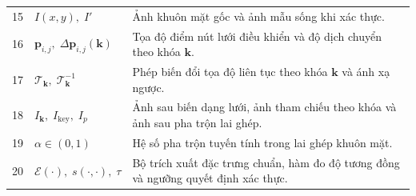 {\begin{longtable}{r l >{\raggedright\arraybackslash}p{8.8cm}}
15 & $I(x, y),\; I'$ & Ảnh khuôn mặt gốc và ảnh mẫu sống khi xác thực. \\
16 & $\mathbf{p}_{i,j},\; \Delta \mathbf{p}_{i,j}(\mathbf{k})$ & Tọa độ điểm nút lưới điều khiển và độ dịch chuyển theo khóa $\mathbf{k}$. \\
17 & $\mathcal{T}_{\mathbf{k}},\; \mathcal{T}_{\mathbf{k}}^{-1}$ & Phép biến đổi tọa độ liên tục theo khóa $\mathbf{k}$ và ánh xạ ngược. \\
18 & $I_{\mathbf{k}},\; I_{\text{key}},\; I_p$ & Ảnh sau biến dạng lưới, ảnh tham chiếu theo khóa và ảnh sau pha trộn lai ghép. \\
19 & $\alpha \in (0, 1)$ & Hệ số pha trộn tuyến tính trong lai ghép khuôn mặt. \\
20 & $\mathcal{E}(\cdot),\; s(\cdot, \cdot),\; \tau$ & Bộ trích xuất đặc trưng chuẩn, hàm đo độ tương đồng và ngưỡng quyết định xác thực. \\
\end{longtable}
\addtocounter{table}{-1}
}

